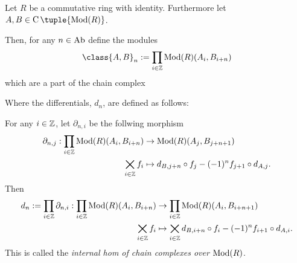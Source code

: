 \begin{definition}
    \label{def:internal_hom_of_chain_complexes_over_Mod(R)}
    Let \( R \) be a commutative ring with identity. Furthermore let \( A, B \in \C \tuple{\Mod(R)} \).

    Then, for any \( n \in \operatorname{Ab} \) define the modules
    \[
        \class{A, B}_n := \prod_{i \in \Zb} \Mod(R)(A_i, B_{i + n})
    \]
    which are a part of the chain complex
    \begin{center}
    \end{center}

    Where the differentials, \( d_n \), are defined as follows:
    
    For any \( i \in {\mathbb{Z}} \), let \( \partial_{n, i} \) be the follwing morphism
    \begin{align*}
        \partial_{n, j} : \prod_{i \in {\mathbb{Z}}}\operatorname{Mod}(R)(A_i, B_{i + n}) &\to \operatorname{Mod}(R)(A_j, B_{j + n + 1}) \\
        \bigtimes_{i \in {\mathbb{Z}}} f_i &\mapsto d_{B, j + n} \circ f_j - (-1)^n f_{j + 1} \circ d_{A, j}.
    \end{align*}
    Then
    \begin{align*}
        d_n := \prod_{i \in {\mathbb{Z}}} \partial_{n, i}: \prod_{i \in {\mathbb{Z}}} \operatorname{Mod}(R)(A_i, B_{i + n}) &\to \prod_{i \in {\mathbb{Z}}} \operatorname{Mod}(R)(A_i, B_{i + n + 1}) \\
        \bigtimes_{i \in {\mathbb{Z}}} f_i &\mapsto \bigtimes_{i \in {\mathbb{Z}}} d_{B, i + n} \circ f_i - (-1)^n f_{i + 1} \circ d_{A, i}.
    \end{align*}
    This is called the \emph{internal hom of chain complexes over \( \operatorname{Mod}(R) \)}.
\end{definition}

